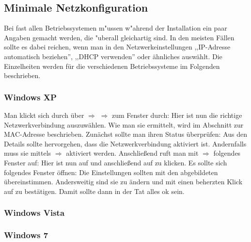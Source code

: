 \documentclass[12pt,titlepage,twoside]{scrartcl}
\begin{document}
\subsection{Minimale Netzkonfiguration}
Bei fast allen Betriebssystemen m"ussen w"ahrend der Installation ein paar
Angaben gemacht werden, die "uberall gleichartig sind. In den meisten
Fällen sollte es dabei reichen, wenn man in den Netzwerkeinstellungen
,,IP-Adresse automatisch beziehen'', ,,DHCP verwenden'' oder ähnliches
auswählt. Die Einzelheiten werden für die verschiedenen
Betriebssysteme im Folgenden beschrieben.
\subsubsection{Windows XP}
Man klickt sich durch  über  $\Rightarrow$
 $\Rightarrow$  zum Fenster
 durch: 
Hier ist nun die richtige Netzwerkverbindung auszuwählen. Wie man sie
ermittelt, wird im Abschnitt zur MAC-Adresse beschrieben. Zunächst
sollte man ihren Status überprüfen:
Aus den Details sollte hervorgehen, dass die Netzwerkverbindung
aktiviert ist. Andernfalls muss sie mittels
$\Rightarrow$ aktiviert
werden. Anschließend ruft man mit
$\Rightarrow$ folgendes Fenster auf:  
Hier ist nun auf  und anschließend
auf  zu klicken. Es sollte sich folgendes Fenster
öffnen:
Die Einstellungen sollten mit den abgebildeten
übereinstimmen. Andersweitig sind sie zu ändern und mit einen
beherzten Klick auf  zu bestätigen. Damit sollte dann in der
Tat alles ok sein.
\subsubsection{Windows Vista}

\subsubsection{Windows 7}
\end{document}

